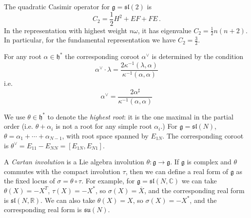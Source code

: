 \documentclass[12pt,letterpaper,reqno]{amsart}
\numberwithin{equation}{section}
\newcommand{\fg}{{\mathfrak g}}
\newcommand{\fh}{{\mathfrak h}}
\newcommand{\fsl}{{\mathfrak {sl}}}
\newcommand{\fsu}{{\mathfrak {su}}}
\newcommand{\bbR}{\ensuremath{\mathbb R}}
\newcommand{\bbC}{\ensuremath{\mathbb C}}
\newcommand{\vertex}{\mathcal{V}}
\newcommand{\abs}[1]{\lvert#1\rvert}
\newcommand{\ti}[1]{\textit{#1}}
\DeclareRobustCommand{\fixme}[1]{\leavevmode{\color{orange}[#1]}}
\begin{document}
The quadratic Casimir operator for $\fg = \fsl(2)$ is
\begin{equation}
  C_2 = \frac12 H^2 + EF + FE \, .
\end{equation}
In the representation with highest weight $n \omega$, it has 
eigenvalue $C_2 = \frac12 n(n+2)$.
In particular, for the fundamental representation we have $C_2 = \frac32$.

For any root $\alpha \in \fh^*$ the corresponding coroot $\alpha^\vee$ is determined by the condition
\begin{equation}
  \alpha^\vee \cdot \lambda = \frac{2 \kappa^{-1}(\lambda,\alpha)}{\kappa^{-1}(\alpha,\alpha)}
\end{equation}
i.e.
\begin{equation}
  \alpha^\vee = \frac{2 \alpha^\sharp}{\kappa^{-1}(\alpha,\alpha)}
\end{equation}

We use $\theta \in \fh^*$ to denote the \ti{highest root}: it is the one maximal in the partial order
(i.e. $\theta + \alpha_i$ is not a root for any simple root $\alpha_i$.)
For $\fg = \fsl(N)$, $\theta = \alpha_1 + \cdots + \alpha_{N-1}$, with root space spanned by $E_{1N}$.
The corresponding coroot is $\theta^\vee = E_{11} - E_{NN} = [E_{1N}, E_{N1}]$.

A \ti{Cartan involution} is a Lie algebra involution $\theta: \fg \to \fg$.
If $\fg$ is complex and 
$\theta$ commutes with the compact involution $\tau$, then
we can define a real form of $\fg$ as the fixed locus of $\sigma = \theta \circ \tau$.
For example, for $\fg = \fsl(N,\bbC)$ we can take $\theta(X) = - X^T$,
$\tau(X) = - X^*$, so $\sigma(X) = \overline{X}$,
and the corresponding real form is $\fsl(N,\bbR)$.
We can also take $\theta(X) = X$,
so $\sigma(X) = - X^*$,
and the corresponding real form is $\fsu(N)$.



\end{document}
